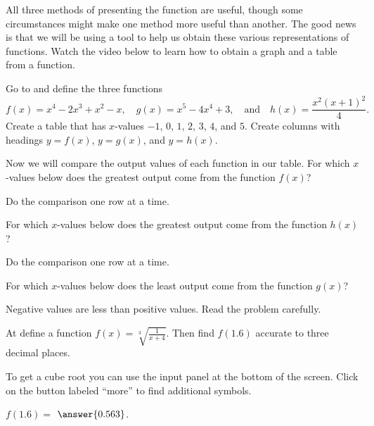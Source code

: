 \documentclass{ximera}
\begin{document}
All three methods of presenting the function are useful, though some circumstances might make one method more useful than another. The good news is that we will be using a tool to help us obtain these various representations of functions. Watch the video below to learn how to obtain a graph and a table from a function.

\begin{question}
Go to  and define the three functions 
\[
f(x)=x^4-2x^3+x^2-x,\quad g(x)=x^5-4x^4+3,\quad\text{and}\quad h(x)=\frac{x^2(x+1)^2}{4}.
\]
Create a table that has $x$-values $-1$, $0$, $1$, $2$, $3$, $4$, and $5$. Create columns with headings $y=f(x)$, $y=g(x)$, and $y=h(x)$.

Now we will compare the output values of each function in our table. For which $x$-values below does the greatest output come from the function $f(x)$?

    \begin{multipleChoice}
    \end{multipleChoice}
    \begin{hint}
    Do the comparison one row at a time.
    \end{hint}    
For which $x$-values below does the greatest output come from the function $h(x)$?
    \begin{multipleChoice}
    \end{multipleChoice}
    \begin{hint}
    Do the comparison one row at a time.
    \end{hint}
For which $x$-values below does the least output come from the function $g(x)$?
    \begin{multipleChoice}
    \end{multipleChoice}
    \begin{hint}
    Negative values are less than positive values. Read the problem carefully.
    \end{hint}

\end{question}

\begin{question}
At  define a function $f(x)=\sqrt[3]{\frac{1}{x+4}}$. Then find $f(1.6)$ accurate to three decimal places.

\begin{hint}
To get a cube root you can use the input panel at the bottom of the screen. Click on the button labeled ``more'' to find additional symbols. 
\end{hint}
$f(1.6)=$ $\answer{0.563}$.

\end{question}
\end{document}
